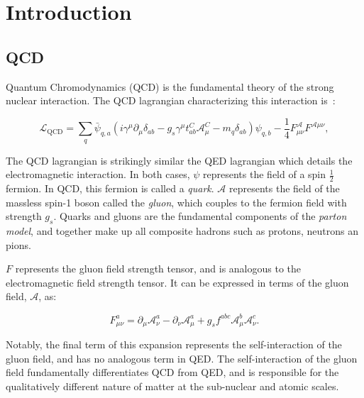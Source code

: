 \chapter{Introduction}

\section{QCD}
\label{sec:QCD}
Quantum Chromodynamics (QCD) is the fundamental theory of the strong nuclear interaction. The QCD lagrangian characterizing this interaction is~\cite{and2010}:


\begin{equation}
  \mathcal{L}_\mathrm{QCD} = \sum_q \bar{\psi}_{q,a}\left(i\gamma^\mu\partial_\mu \delta_{ab} -g_s\gamma^\mu t^{C}_{ab} \mathcal{A}_\mu^C - m_q\delta_{ab}\right) \psi_{q,b} - \frac{1}{4}F^\mathcal{A}_{\mu\nu}F^{\mathcal{A}\mu\nu},
\label{eq:qcd_lagrangian}
\end{equation} 

The QCD lagrangian is strikingly similar the QED lagrangian which details the electromagnetic interaction. In both cases, $\psi$ represents the field of a spin $\frac{1}{2}$ fermion. In QCD, this fermion is called a \textit{quark}. $\mathcal{A}$ represents the field of the massless spin-1 boson called the \textit{gluon}, which couples to the fermion field with strength $g_s$. Quarks and gluons are the fundamental components of the \textit{parton model}, and together make up all composite hadrons such as protons, neutrons an pions.

$F$ represents the gluon field strength tensor, and is analogous to the electromagnetic field strength tensor. It can be expressed in terms of the gluon field, $\mathcal{A}$, as:

\begin{equation}
  F^a_{\mu \nu} = \partial_\mu \mathcal{A}^a_\nu - \partial_\nu \mathcal{A}^a_\mu + g_s f^{abc} \mathcal{A}^b_\mu \mathcal{A}^c_\nu.
\label{eq: gluon_tensor}
\end{equation}

Notably, the final term of this expansion represents the self-interaction of the gluon field, and has no analogous term in QED. The self-interaction of the gluon field fundamentally differentiates QCD from QED, and is responsible for the qualitatively different nature of matter at the sub-nuclear and atomic scales.

